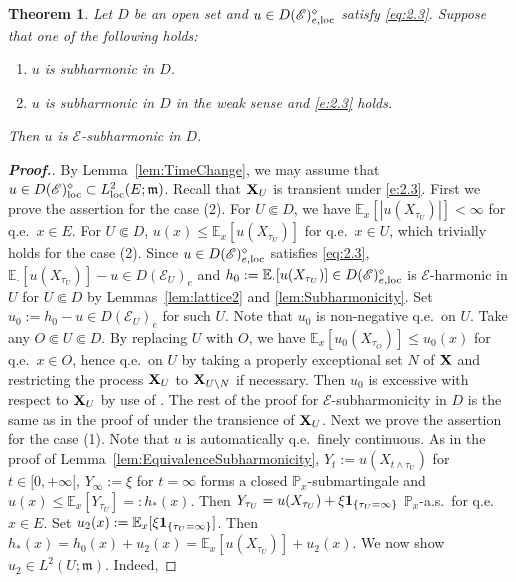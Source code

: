 \documentclass[12pt,a4paper]{article}
\newtheorem{thm}{Theorem}[section]
\newcommand{\m}{\mathfrak{m} }
\newcommand{\loc}{{\rm loc}}
\newcommand{\1}{{\bf 1}}
\begin{document}
\begin{thm}\label{thm:3.10*}
Let $D$ be an open set and $u\in D(\mathscr{E})_{e,\loc}^{\diamond}$ satisfy 
 \eqref{eq:2.3}. 
Suppose that one of the following holds: 
\begin{enumerate}
\item[\rm(1)] $u$ is subharmonic in $D$.
\item[\rm(2)] $u$ is subharmonic in $D$ in the weak sense  
and \eqref{e:2.3} holds. 
\end{enumerate}
Then $u$ is $\mathscr{E}$-subharmonic in $D$. 
\end{thm}
\begin{proof}[{\bf Proof.}]
By Lemma~\ref{lem:TimeChange}, we may assume that 
$u\in D(\mathscr{E})_{\loc}^{\diamond}\subset L^2_{\loc}(E;{\m})$. 
Recall that ${\bf X}_U$ is transient under \eqref{e:2.3}.  
First we prove the assertion for the case (2). 
For $U\Subset D$, we have 
$\mathbb{E}_x[|u(X_{\tau_U})|]<\infty$ for q.e.~$x\in E$. 
For $U\Subset D$, $u(x)\leq\mathbb{E}_x[u(X_{\tau_U})]$ for q.e.~$x\in U$, which trivially holds for the case (2). 
Since $u\in  D(\mathscr{E})_{e,\loc}^{\diamond}$ satisfies \eqref{eq:2.3}, $\mathbb{E}_{\cdot}[u(X_{\tau_U})]-u\in D(\mathscr{E}_U)_e$ and $h_0:=\mathbb{E}_{\cdot}[u(X_{\tau_U})]\in D(\mathscr{E})^{\diamond}_{e,\loc}$ is $\mathscr{E}$-harmonic in $U$ for $U\Subset D$   
by Lemmas~\ref{lem:lattice2} and \ref{lem:Subharmonicity}.  
Set 
$u_0:=h_0-u\in D(\mathscr{E}_U)_e$ for such $U$. 
Note that $u_0$ is non-negative q.e.~on $U$.  
Take any $O\Subset U\Subset D$.   
By replacing $U$ with $O$, we have $\mathbb{E}_x[u_0(X_{\tau_O})]\leq u_0(x)$ for q.e.~$x\in O$, hence q.e.~on $U$ by taking a properly exceptional set $N$ of ${\bf X}$ and restricting the process ${\bf X}_U$ to ${\bf X}_{U\setminus N}$ if necessary. 
Then $u_0$ is excessive with respect to 
${\bf X}_U$ by use of \cite[Theorem~12.4]{Dyn:Mar}.
The rest of the proof for $\mathscr{E}$-subharmonicity in $D$ is the same as in the proof of 
\cite[Theorem~3.12]{CK} under the transience of ${\bf X}_U$. 
Next we prove the assertion for the case (1). Note that $u$ is automatically q.e.~finely continuous. As in the proof of Lemma~\ref{lem:EquivalenceSubharmonicity}, 
$Y_t:=u(X_{t\land\tau_U})$ for $t\in[0,+\infty[$, $Y_{\infty}:=\xi$ for $t=\infty$ forms a closed $\mathbb{P}_x$-submartingale and $u(x)\leq \mathbb{E}_x[Y_{\tau_U}]=:h_*(x)$. Then 
$Y_{\tau_U}=u(X_{\tau_U})+\xi\1_{\{\tau_U=\infty\}}$ $\mathbb{P}_x$-a.s.~for 
q.e.~$x\in E$. Set $u_2(x):=\mathbb{E}_x[\xi\1_{\{\tau_U=\infty\}}]$. 
Then $h_*(x)=h_0(x)+u_2(x)=\mathbb{E}_x[u(X_{\tau_U})]+u_2(x)$. We now show $u_2\in L^2(U;{\m})$. Indeed, 

\end{proof}
\end{document}
